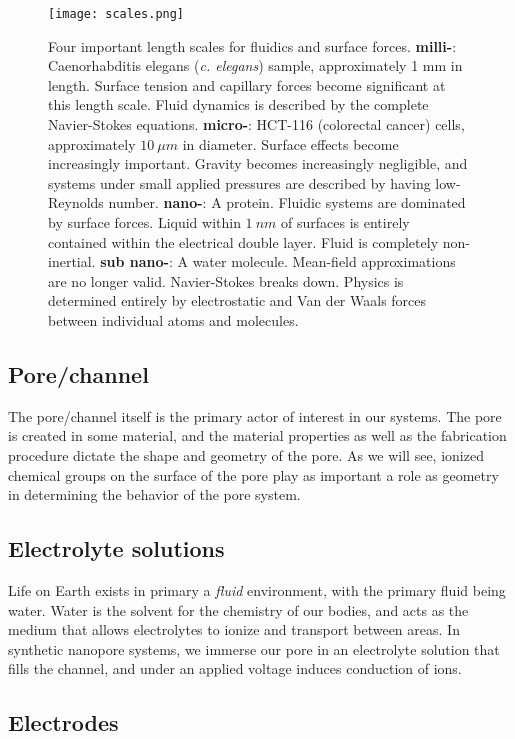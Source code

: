 		\begin{figure}[h]
			\texttt{[image: scales.png]}
			\caption{Four important length scales for fluidics and surface forces. \textbf{milli-}: Caenorhabditis elegans (\textit{c. elegans}) sample, approximately 1 mm in length. Surface tension and capillary forces become significant at this length scale. Fluid dynamics is described by the complete Navier-Stokes equations. \textbf{micro-}: HCT-116 (colorectal cancer) cells, approximately $\SI{10}{\mu m}$ in diameter. Surface effects become increasingly important. Gravity becomes increasingly negligible, and systems under small applied pressures are described by having low-Reynolds number. \textbf{nano-}: A protein. Fluidic systems are dominated by surface forces. Liquid within $\SI{1}{nm}$ of surfaces is entirely contained within the electrical double layer. Fluid is completely non-inertial. \textbf{sub nano-}: A water molecule. Mean-field approximations are no longer valid. Navier-Stokes breaks down. Physics is determined entirely by electrostatic and Van der Waals forces between individual atoms and molecules.}
		\end{figure}
		
		\subsection{Pore/channel}
		
			The pore/channel itself is the primary actor of interest in our systems. The pore is created in some material, and the material properties as well as the fabrication procedure dictate the shape and geometry of the pore. As we will see, ionized chemical groups on the surface of the pore play as important a role as geometry in determining the behavior of the pore system.
		
		\subsection{Electrolyte solutions}
		
			Life on Earth exists in primary a \textit{fluid} environment, with the primary fluid being water. Water is the solvent for the chemistry of our bodies, and acts as the medium that allows electrolytes to ionize and transport between areas. In synthetic nanopore systems, we immerse our pore in an electrolyte solution that fills the channel, and under an applied voltage induces conduction of ions.
			
		\subsection{Electrodes}
		
